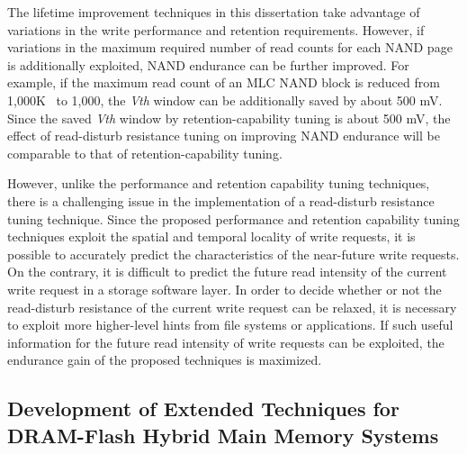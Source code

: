 The lifetime improvement techniques in this dissertation take advantage of variations in the write performance and retention requirements.
However, if variations in the maximum required number of read counts for each NAND page is additionally exploited, NAND endurance can be further improved.
For example, if the maximum read count of an MLC NAND block is reduced from 1,000K~\cite{ReadDisturb_Ha} to 1,000, the \textit{Vth} window can be additionally saved by about 500 mV.
Since the saved \textit{Vth} window by retention-capability tuning is about 500 mV, the effect of read-disturb resistance tuning on improving NAND endurance will be comparable to that of retention-capability tuning.

However, unlike the performance and retention capability tuning techniques, there is a challenging issue in the implementation of a read-disturb resistance tuning technique.
Since the proposed performance and retention capability tuning techniques exploit the spatial and temporal locality of write requests, it is possible to accurately predict the characteristics of the near-future write requests.
On the contrary, it is difficult to predict the future read intensity of the current write request in a storage software layer.
In order to decide whether or not the read-disturb resistance of the current write request can be relaxed, it is necessary to exploit more higher-level hints from file systems or applications.
If such useful information for the future read intensity of write requests can be exploited, the endurance gain of the proposed techniques is maximized.


\subsection{Development of Extended Techniques for\\ DRAM-Flash Hybrid Main Memory Systems}

